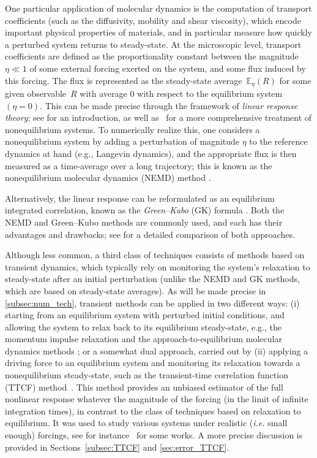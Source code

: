 \documentclass[11pt]{article}
\newcommand{\E}{\mathbb{E}}
\theoremstyle{definition}
\begin{document}
One particular application of molecular dynamics is the computation of transport coefficients (such as the diffusivity, mobility and shear viscosity), which encode important physical properties of materials, and in particular measure how quickly a perturbed system returns to steady-state. At the microscopic level, transport coefficients are defined as the proportionality constant between the magnitude $\eta\ll 1$ of some external forcing exerted on the system, and some flux induced by this forcing. The flux is represented as the steady-state average~$\E_\eta(R)$ for some given observable~$R$ with average 0 with respect to the equilibrium system $(\eta=0)$. This can be made precise through the framework of \emph{linear response theory}; see \cite[Chapter 8]{chandler1987} for an introduction, as well as~\cite{evans2016} for a more comprehensive treatment of nonequilibrium systems. To numerically realize this, one considers a nonequilibrium system by adding a perturbation of magnitude $\eta$ to the reference dynamics at hand (e.g., Langevin dynamics), and the appropriate flux is then measured as a time-average over a long trajectory; this is known as the nonequilibrium molecular dynamics (NEMD) method \cite{ciccotti2005}.

Alternatively, the linear response can be reformulated as an equilibrium integrated correlation, known as the \emph{Green--Kubo} (GK) formula \cite{green1954,kubo1957}. Both the NEMD and Green--Kubo methods are commonly used, and each has their advantages and drawbacks; see \cite{stoltz2024} for a detailed comparison of both approaches. 

Although less common, a third class of techniques consists of methods based on transient dynamics, which typically rely on monitoring the system's relaxation to steady-state after an initial perturbation (unlike the NEMD and GK methods, which are based on steady-state averages). As will be made precise in \cref{subsec:num_tech}, transient methods can be applied in two different ways: (i) starting from an equilibrium system with perturbed initial conditions, and allowing the system to relax back to its equilibrium steady-state, e.g., the momentum impulse relaxation \cite{arya2000} and the approach-to-equilibrium molecular dynamics methods \cite{lampin2013}; or a somewhat dual approach, carried out by (ii) applying a driving force to an equilibrium system and monitoring its relaxation towards a nonequilibrium steady-state, such as the transient-time correlation function (TTCF) method~\cite{morriss1987,evans1988}. This method provides an unbiased estimator of the full nonlinear response whatever the magnitude of the forcing (in the limit of infinite integration times), in contrast to the class of techniques based on relaxation to equilibrium. It was used to study various systems under realistic (\emph{i.e.} small enough) forcings, see for instance~\cite{delhommelle2005, pan2006, bernardi2012, bernardi2016, maffioli2022, maffioli2024} for some works. A more precise discussion is provided in Sections~\ref{subsec:TTCF} and \ref{sec:error_TTCF}.
\end{document}
